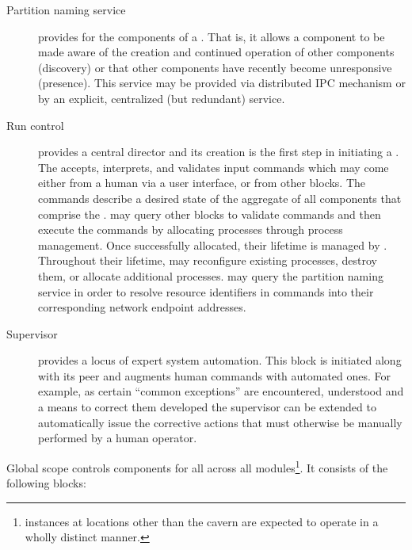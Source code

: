 \begin{description}
\item[Partition naming service] provides  for the components of a . 
  That is, it allows a component to be made aware  of the creation and continued operation of other components (discovery) or that other components have recently become unresponsive (presence). 
  This service may be provided via distributed IPC mechanism or by an explicit, centralized (but redundant) service.

\item[Run control] provides a central director and its creation is the first step in initiating a . 
  The  accepts, interprets, and validates input commands which may come either from a human via a user interface, or from other blocks. 
  The commands describe a desired state of the aggregate of all components that comprise the . 
   may query other blocks to validate commands and then execute the commands by allocating processes through process management. 
  Once successfully allocated, their lifetime is managed by . 
  Throughout their lifetime,  may reconfigure existing processes, destroy them, or allocate additional processes. 
   may query the partition naming service in order to resolve resource identifiers in commands into their corresponding network endpoint addresses.  

\item[Supervisor] provides a locus of expert system automation. 
  This block is initiated along with its  peer and augments human commands with automated ones. 
  For example, as certain ``common exceptions'' are encountered, understood and a means to correct them developed the supervisor can be extended to automatically issue the corrective actions that must otherwise be manually performed by a human operator.

\end{description}

Global scope controls  components for all  across all  modules\footnote{ instances at locations other than the  cavern are expected to operate in a wholly distinct manner.}.  It consists of the following blocks:


